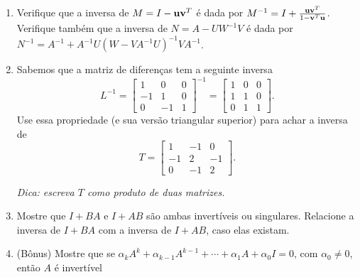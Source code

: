 \documentclass[leqno]{article}
\begin{document}
\begin{enumerate}
\item Verifique que a inversa de $M = I - \mathbf{u} \mathbf{v}^T$ é dada por $M^{-1} = I + \frac{\mathbf{u}\mathbf{v}^T}{1 - \mathbf{v}^T\mathbf{u}}$. Verifique também que a inversa de $N = A - UW^{-1}V$ é dada por $N^{-1} = A^{-1} + A^{-1}U(W - VA^{-1}U)^{-1}VA^{-1}$.

\begin{sol} 
\end{sol} 

\item Sabemos que a matriz de diferenças tem a seguinte inversa
$$L^{-1} = \begin{bmatrix}
1 & 0 & 0\\
-1 & 1 & 0\\
0 & -1 & 1
\end{bmatrix}^{-1} = \begin{bmatrix}
1 & 0 & 0\\
1 & 1 & 0\\
0 & 1 & 1
\end{bmatrix}.$$
Use essa propriedade (e sua versão triangular superior) para achar a inversa de
$$T = \begin{bmatrix}
1 & -1 & 0\\
-1 & 2 & -1\\
0 & -1 & 2
\end{bmatrix}.$$

\textit{Dica: escreva $T$ como produto de duas matrizes.}

\begin{sol} 
\end{sol} 

\item Mostre que $I + BA$ e $I + AB$ são ambas invertíveis ou singulares. Relacione a inversa de $I + BA$ com a inversa de $I + AB$, caso elas existam.

\begin{sol} 
\end{sol}

\item (Bônus) Mostre que se $\alpha_kA^k + \alpha_{k-1}A^{k-1} + \cdots + \alpha_1 A + \alpha_0 I = 0$, com $\alpha_0 \neq 0$, então $A$ é invertível

\begin{sol} 
\end{sol} 
\end{enumerate}
\end{document}
